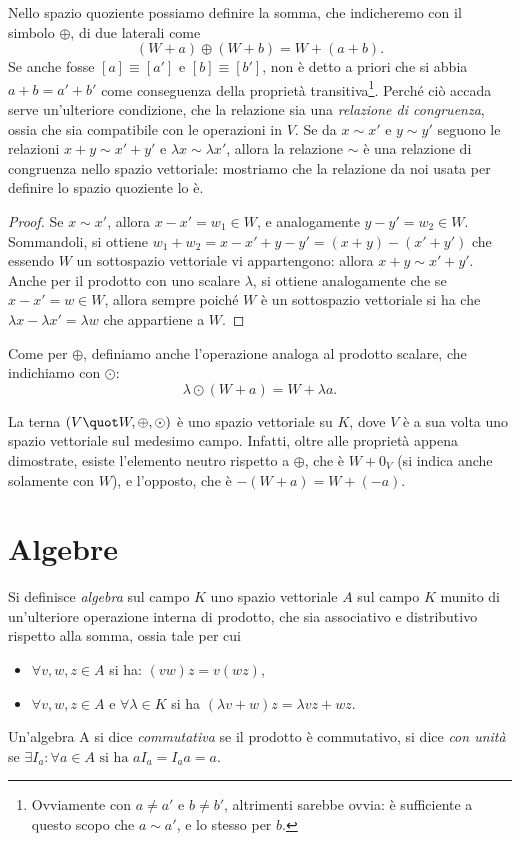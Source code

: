 Nello spazio quoziente possiamo definire la somma, che indicheremo con il simbolo $\oplus$, di due laterali come
\begin{equation*}
	(W+  a)\oplus(W+  b)=W+(  a+  b).
\end{equation*}
Se anche fosse $[  a]\equiv[  a']$ e $[  b]\equiv[  b']$, non è detto a priori che si abbia $  a+  b=  a'+  b'$ come conseguenza della proprietà transitiva\footnote{Ovviamente con $  a\neq  a'$ e $  b\neq  b'$, altrimenti sarebbe ovvia: è sufficiente a questo scopo che $  a\sim  a'$, e lo stesso per $  b$.}.
Perché ciò accada serve un'ulteriore condizione, che la relazione sia una \emph{relazione di congruenza}, ossia che sia compatibile con le operazioni in $V$.
Se da $  x\sim  x'$ e $  y\sim  y'$ seguono le relazioni $  x+  y\sim   x'+  y'$ e $\lambda  x\sim\lambda  x'$, allora la relazione $\sim$ è una relazione di congruenza nello spazio vettoriale: mostriamo che la relazione da noi usata per definire lo spazio quoziente lo è.
\begin{proof}
	Se $  x\sim  x'$, allora $  x-  x'=  w_1\in W$, e analogamente $  y-  y'=  w_2\in W$.
	Sommandoli, si ottiene $  w_1+  w_2=  x-  x'+  y-  y'=(  x+  y)-(  x'+  y')$ che essendo $W$ un sottospazio vettoriale vi appartengono: allora $  x+  y\sim  x'+  y'$.
	Anche per il prodotto con uno scalare $\lambda$, si ottiene analogamente che se $  x-  x'=  w\in W$, allora sempre poiché $W$ è un sottospazio vettoriale si ha che $\lambda  x-\lambda  x'=\lambda  w$ che appartiene a $W$.
\end{proof}
Come per $\oplus$, definiamo anche l'operazione analoga al prodotto scalare, che indichiamo con $\odot$:
\begin{equation*}
	\lambda\odot(W+  a)=W+\lambda  a.
\end{equation*}

La terna $(V\quot W,\oplus,\odot)$ è uno spazio vettoriale su $K$, dove $V$ è a sua volta uno spazio vettoriale sul medesimo campo.
Infatti, oltre alle proprietà appena dimostrate, esiste l'elemento neutro rispetto a $\oplus$, che è $W+0_V$ (si indica anche solamente con $W$), e l'opposto, che è $-(W+  a)=W+(-  a)$.

\section{Algebre}
\begin{definizione} \label{d:algebra}
	Si definisce \emph{algebra} sul campo $K$ uno spazio vettoriale $A$ sul campo $K$ munito di un'ulteriore operazione interna di prodotto, che sia associativo e distributivo rispetto alla somma, ossia tale per cui
	\begin{itemize}
		\item $\forall v,w,z\in A$ si ha: $(v w) z = v (w z)$,
		\item $\forall v,w,z\in A$ e $\forall \lambda\in K$ si ha $(\lambda v + w)z = \lambda v z + w z$.
	\end{itemize}
\end{definizione}
Un'algebra A si dice  \emph{commutativa} se il prodotto è commutativo, si dice \emph{con unità} se $\exists I_a\colon \forall a\in A \text{ si ha } a I_a = I_a a = a$.
